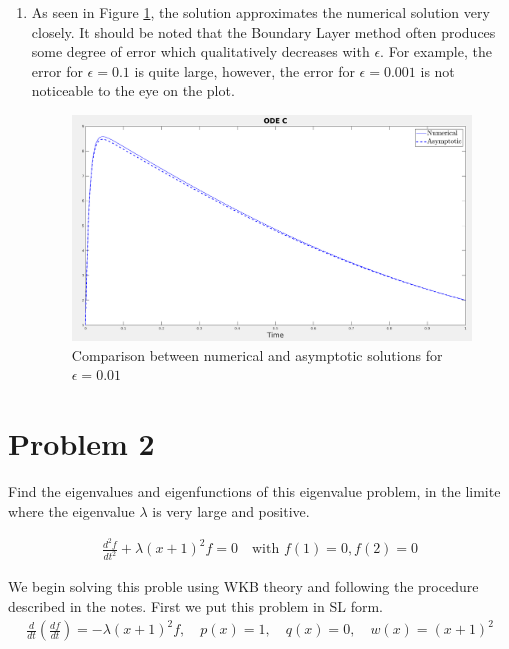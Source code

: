 \documentclass{article}
\begin{document}
\begin{enumerate}[label=\alph*.]
    \item As seen in Figure \ref{fig:ODEC_comp}, the solution approximates the
    numerical solution very closely. It should be noted that the Boundary Layer
    method often produces some degree of error which qualitatively decreases with
    $\epsilon$. For example, the error for $\epsilon = 0.1$ is quite large,
    however, the error for $\epsilon = 0.001$ is not noticeable to the eye on
    the plot. 
        \begin{figure}
            \centering
            \includegraphics[width=.8\textwidth]{images/ODEC_sol.png}
            \caption{Comparison between numerical and asymptotic solutions for
            $\epsilon = 0.01$}
            \label{fig:ODEC_comp}
        \end{figure}

\end{enumerate}

\vspace{10pt}

\hline

\vspace{10pt}

\section*{Problem 2}
Find the eigenvalues and eigenfunctions of this eigenvalue problem, in the
limite where the eigenvalue $\lambda$ is very large and positive. 

\begin{gather*}
    \frac{d^2f}{dt^2} + \lambda(x+1)^2f = 0 \quad \text{with } f(1) = 0, f(2) =
    0
\end{gather*}

We begin solving this proble using WKB theory and following the procedure
described in the notes. First we put this problem in SL form. 
\begin{gather*}
    \frac{d}{dt}\left(\frac{df}{dt}\right) = -\lambda(x+1)^2f, \quad p(x) = 1,
    \quad q(x) = 0, \quad w(x) = (x+1)^2
\end{gather*}
\end{document}
